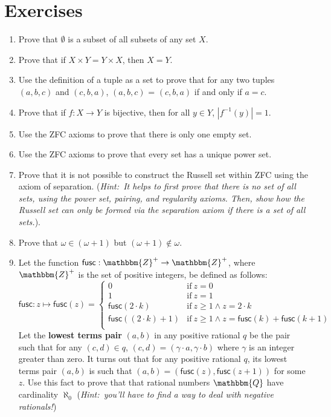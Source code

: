\documentclass[11pt]{article}
\theoremstyle{definition}
\theoremstyle{remark}
\begin{document}
\section*{Exercises}
\begin{enumerate}
    \item Prove that $\emptyset$ is a subset of all subsets of any set $X$.

    \item Prove that if $X\times Y = Y\times X$, then $X=Y$.

    \item Use the definition of a tuple as a set to prove that for any two tuples $(a,b,c)$ and $(c,b,a)$, $(a,b,c)$ = $(c,b,a)$ if and only if $a=c$.

    \item Prove that if $f:X\rightarrow Y$ is bijective, then for all $y\in Y$, $|f^{-1}(y)|=1$. 

    \item Use the ZFC axioms to prove that there is only one empty set.

    \item Use the ZFC axioms to prove that every set has a unique power set.

    \item Prove that it is not possible to construct the Russell set within ZFC using the axiom of separation. (\textit{Hint:\ It helps to first prove that there is no set of all sets, using the power set, pairing, and regularity axioms. Then, show how the Russell set can only be formed via the separation axiom if there is a set of all sets.}).

    \item Prove that $\omega\in(\omega+1)$ but $(\omega + 1)\not\in\omega$. 

    \item Let the function $\textsf{fusc}:\mathbbm{Z}^{+}\rightarrow\mathbbm{Z}^{+}$, where $\mathbbm{Z}^{+}$ is the set of positive integers, be defined as follows:
    \begin{equation*}
    \textsf{fusc}:z\mapsto \textsf{fusc}(z) = \begin{cases}
        0 & \text{if} \ z=0\\
        1 & \text{if} \ z=1\\
        \textsf{fusc}(2\cdot k) & \text{if} \ z\geq 1 \wedge z=2\cdot k\\
        \textsf{fusc}((2\cdot k)+1) & \text{if} \ z\geq 1 \wedge z=\textsf{fusc}(k) + \textsf{fusc}(k+1)\\
    \end{cases}
    \end{equation*}
        Let the \textbf{lowest terms pair} $(a,b)$ in any positive rational $q$ be the pair such that for any $(c,d)\in q$, $(c,d)=(\gamma \cdot a,\gamma \cdot b)$ where $\gamma$ is an integer greater than zero. It turns out that for any positive rational $q$, its lowest terms pair $(a,b)$ is such that $(a,b)=(\textsf{fusc}(z),\textsf{fusc}(z+1))$ for some $z$. Use this fact to prove that that rational numbers $\mathbbm{Q}$ have cardinality $\aleph_{0}$ (\textit{Hint:\ you'll have to find a way to deal with negative rationals!})
\end{enumerate}
\end{document}
